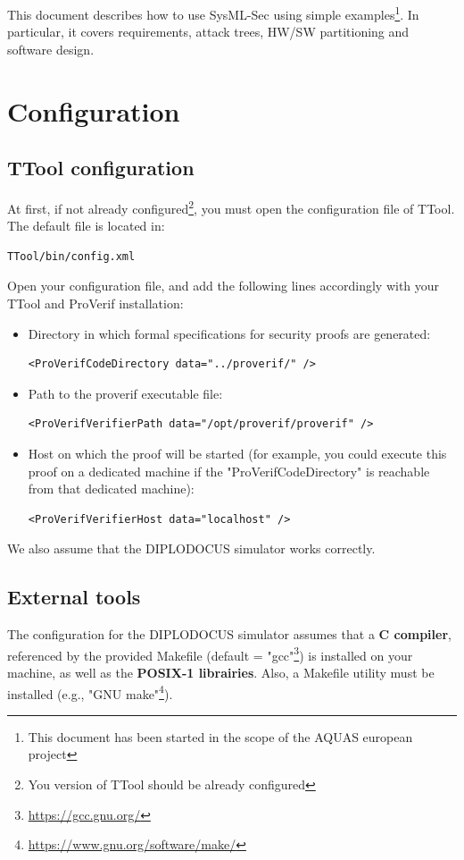 \documentclass[12pt]{article}
\begin{document}
This document describes how to use SysML-Sec using simple examples\footnote{This document has been started in the scope of the AQUAS european project}. In particular, it covers requirements, attack trees, HW/SW partitioning and software design.

\newpage

\section{Configuration}\label{sec:conf}
\subsection{TTool configuration}
At first, if not already configured\footnote{You version of TTool should be already configured}, you must open the configuration file of TTool. The default file is located in:
\begin{verbatim}
TTool/bin/config.xml
\end{verbatim}
Open your configuration file, and add the following lines accordingly with your TTool and ProVerif installation:
\begin{itemize}
\item Directory in which formal specifications for security proofs are generated:
\begin{verbatim}
<ProVerifCodeDirectory data="../proverif/" />
\end{verbatim}
\item Path to the proverif executable file:
\begin{verbatim}
<ProVerifVerifierPath data="/opt/proverif/proverif" />
\end{verbatim}
\item Host on which the proof will be started (for example, you could execute this proof on a dedicated machine if the "ProVerifCodeDirectory" is reachable from that dedicated machine):
\begin{verbatim}
<ProVerifVerifierHost data="localhost" />
\end{verbatim}
\end{itemize}
We also assume that the DIPLODOCUS simulator works correctly.


\subsection{External tools}
The  configuration for the DIPLODOCUS simulator assumes that a \textbf{C compiler}, referenced by the provided Makefile (default = "gcc"\footnote{\url{https://gcc.gnu.org/}}) is installed on your machine, as well as the \textbf{POSIX-1 librairies}. Also, a Makefile utility must be installed (e.g., "GNU make"\footnote{\url{https://www.gnu.org/software/make/}}).
\end{document}
